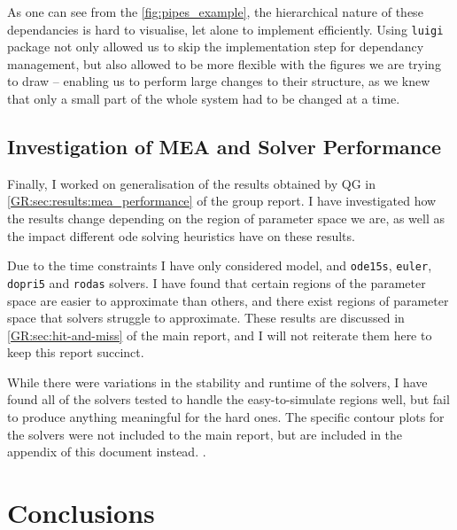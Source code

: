As one can see from the \autoref{fig:pipes_example}, the hierarchical nature of these dependancies is hard to visualise, let alone to implement efficiently.
Using {\tt luigi} package not only allowed us to skip the implementation step for dependancy management, but also allowed to be more flexible with the figures we are trying to draw -- enabling us to perform large changes to their structure, as we knew that only a small part of the whole system had to be changed at a time.

\subsection{Investigation of MEA and Solver Performance}

Finally, I worked on generalisation of the results obtained by QG in \autoref{GR:sec:results:mea_performance} of the group report. 
I have investigated how the results change depending on the region of parameter space we are, as well as the impact different \gls{ode} solving heuristics have on these results.

Due to the time constraints I have only considered \pft{} model, and \texttt{ode15s}, \texttt{euler}, \texttt{dopri5} and \texttt{rodas} solvers. 
I have found that certain regions of the parameter space are easier to approximate than others, and there exist regions of parameter space that solvers struggle to approximate. These results are discussed in \autoref*{GR:sec:hit-and-miss} of the main report, and I will not reiterate them here to keep this report succinct.

While there were variations in the stability and runtime of the solvers, I have found all of the solvers tested to handle the easy-to-simulate regions well, but fail to produce anything meaningful for the hard ones.
The specific contour plots for the solvers were not included to the main report, but are included in the appendix of this document instead. .



\section{Conclusions}

